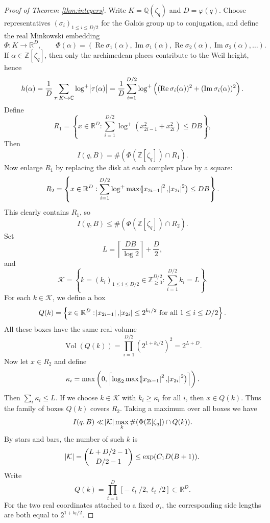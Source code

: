 \documentclass[10pt,a4paper]{amsart}
\newcommand{\bC}{\mathbb{C}}
\newcommand{\bQ}{\mathbb{Q}}
\newcommand{\bR}{\mathbb{R}}
\newcommand{\bZ}{\mathbb{Z}}
\DeclareMathOperator{\Vol}{Vol}
\begin{document}
\begin{proof}[Proof of Theorem \ref{thm:integers}]
Write $K=\bQ(\zeta_q)$ and $D=\varphi(q)$. Choose representatives $(\sigma_i)_{1 \leq i \leq D/2}$ for the Galois group up to conjugation, and define the real Minkowski embedding
\[
\Phi:K \longrightarrow \bR^D,
\qquad
\Phi(\alpha)=
\left(\operatorname{Re} \sigma_1(\alpha),\operatorname{Im} \sigma_1(\alpha),
\operatorname{Re} \sigma_2(\alpha),\operatorname{Im} \sigma_2(\alpha),\dots
\right).
\]
If $\alpha \in \bZ[\zeta_q]$, then only the archimedean places contribute to the Weil height, hence
\[
h(\alpha)
=
\frac{1}{D}\sum_{\tau:K \hookrightarrow \bC} \log^+\abs{\tau(\alpha)}
=
\frac{1}{D}
\sum_{i=1}^{D/2}
\log^+\left((\operatorname{Re}\sigma_i(\alpha))^2+(\operatorname{Im}\sigma_i(\alpha))^2\right).
\]
Define
\[
R_1=
\left\{
x \in \bR^D :
\sum_{i=1}^{D/2}
\log^+\left(x_{2i-1}^2+x_{2i}^2\right)
\leq DB
\right\},
\]
Then
\[
I(q,B)=\#(\Phi(\bZ[\zeta_q]) \cap R_1).
\]
Now enlarge $R_1$ by replacing the disk at each complex place by a square:
\[
R_2=
\left\{
x \in \bR^D :
\sum_{i=1}^{D/2}
\log^+\max\bigl(\abs{x_{2i-1}}^2,\abs{x_{2i}}^2\bigr)
\leq DB
\right\}.
\]
This clearly contains $R_1$, so
\[
I(q,B)\leq \#(\Phi(\bZ[\zeta_q]) \cap R_2).
\]
Set
\[
L=\left\lceil \frac{DB}{\log 2} \right\rceil + \frac{D}{2},
\]
and
\[
\mathcal K=
\left\{
k=(k_i)_{1 \leq i \leq D/2} \in \bZ_{\geq 0}^{D/2} :
\sum_{i=1}^{D/2} k_i=L
\right\}.
\]
For each $k \in \mathcal K$, we define a box
\[
Q(k)=
\left\{
x \in \bR^D :
\abs{x_{2i-1}}, \abs{x_{2i}} \leq 2^{k_i/2}
\text{ for all } 1 \leq i \leq D/2
\right\}.
\]
All these boxes have the same real volume
\[
\Vol(Q(k))=\prod_{i=1}^{D/2} \left(2^{1+k_i/2}\right)^2 = 2^{L+D}.
\]
Now let $x \in R_2$ and define
\[
\kappa_i=
\max\left(0,\left\lceil
\log_2 \max\bigl(\abs{x_{2i-1}}^2,\abs{x_{2i}}^2\bigr)
\right\rceil\right).
\]
Then $\sum_i \kappa_i \leq L$. If we choose $k \in \mathcal K$ with $k_i \geq \kappa_i$ for all $i$, then $x \in Q(k)$. Thus the family of boxes $Q(k)$ covers $R_2$.
Taking a maximum over all boxes we have
\[
I(q,B)
\ll
\abs{\mathcal K}
\max_k \#(\Phi(\bZ[\zeta_q]) \cap Q(k)).
\]
By stars and bars, the number of such $k$ is
\[
\abs{\mathcal K}=\binom{L+D/2-1}{D/2-1} \leq \exp(C_1 D(B+1)).
\]
Write
\[
Q(k)=\prod_{t=1}^D [-\ell_t/2,\ell_t/2] \subset \bR^D.
\]
For the two real coordinates attached to a fixed $\sigma_i$, the corresponding side lengths are both equal to $2^{1+k_i/2}$.


\end{proof}
\end{document}
